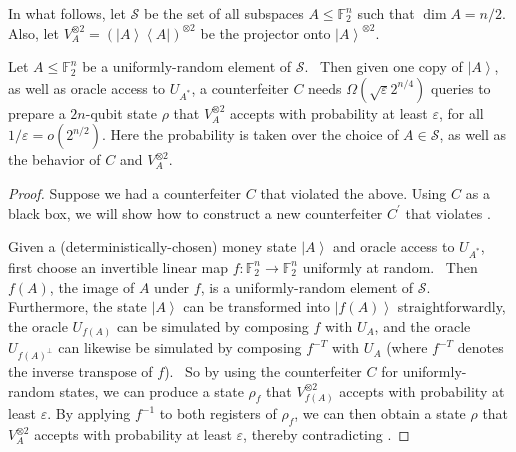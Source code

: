 In what follows, let $\mathcal{S}$ be the set of all subspaces $A\leq
\mathbb{F}_{2}^{n}$ such that $\dim A=n/2$. Also, let $V_{A}^{\otimes
2}=\left(  \left\vert A\right\rangle \left\langle A\right\vert \right)
^{\otimes2}$ be the projector onto $\left\vert A\right\rangle ^{\otimes2}$.

\begin{theorem}
\label{averagecase}Let
$A\leq\mathbb{F}_{2}^{n}$ be a uniformly-random element of $\mathcal{S}$.
\ Then given one copy of $\left\vert A\right\rangle $, as well as oracle
access to $U_{A^{\ast}}$, a counterfeiter $C$ needs $\Omega\left(
\sqrt{\varepsilon}2^{n/4}\right)  $ queries to prepare a $2n$-qubit state
$\rho$ that $V_{A}^{\otimes2}$ accepts with probability at least
$\varepsilon$, for all $1/\varepsilon=o\left(  2^{n/2}\right)  $. Here the
probability is taken over the choice of $A\in\mathcal{S}$, as well as the
behavior of $C$ and $V_{A}^{\otimes2}$.
\end{theorem}

\begin{proof}
Suppose we had a counterfeiter $C$ that violated the above. Using $C$ as a
black box, we will show how to construct a new counterfeiter $C^{\prime}%
$ that violates .

Given a (deterministically-chosen) money state $\left\vert A\right\rangle $
and oracle access to $U_{A^{\ast}}$, first choose an invertible linear map
$f:\mathbb{F}_{2}^{n}\rightarrow\mathbb{F}_{2}^{n}$ uniformly at random.
\ Then $f\left(  A\right)  $, the image of $A$ under $f$, is a
uniformly-random element of $\mathcal{S}$. Furthermore, the state
$\left\vert A\right\rangle $ can be transformed into $\left\vert f\left(
A\right)  \right\rangle $ straightforwardly, the oracle $U_{f\left(
A\right)  }$ can be simulated by composing $f$ with $U_{A}$, and the oracle
$U_{f\left(  A\right)  ^{\bot}}$ can likewise be simulated by composing
$f^{-T}$ with $U_{A}$ (where $f^{-T}$ denotes the inverse transpose of $f$).
\ So by using the counterfeiter $C$ for uniformly-random states, we can
produce a state $\rho_{f}$ that $V_{f\left(  A\right)  }^{\otimes2}$ accepts
with probability at least $\varepsilon$. By applying $f^{-1}$ to both
registers of $\rho_{f}$, we can then obtain a state $\rho$ that
$V_{A}^{\otimes2}$ accepts with probability at least $\varepsilon$, thereby
contradicting .
\end{proof}
